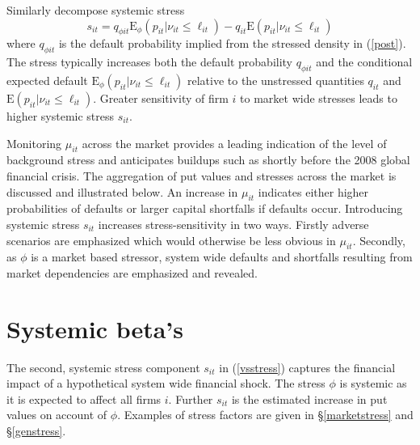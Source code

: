 \documentclass[authoryear]{elsarticle}
\newcommand{\E}{\mathrm{E}}
\newcommand{\eref}[1]{(\ref{#1})}
\newcommand{\sref}[1]{\S\ref{#1}}
\newcommand{\be}[1]{\begin{equation}\label{#1}}
\newcommand{\ee}{\end{equation}}
\begin{document}
Similarly decompose systemic stress
$$
s_{it} = q_{\phi it}\E_\phi(p_{it}|\nu_{it}\le \ell_{it})-q_{it}\E(p_{it}|\nu_{it} \le \ell_{it})
$$
where $q_{\phi it}$ is the default probability implied from the stressed density in \eref{post}. The stress typically increases both the default probability  $q_{\phi it}$ and the conditional expected default $\E_\phi(p_{it}|\nu_{it}\le \ell_{it})$ relative to the unstressed quantities $q_{it}$ and $\E(p_{it}|\nu_{it} \le \ell_{it})$. Greater sensitivity of firm $i$ to market wide stresses leads to higher systemic stress $s_{it}$.

Monitoring $\mu_{it}$ across the market provides a leading indication of the level of background stress and anticipates buildups such as shortly before the 2008 global financial crisis. The aggregation of put values and stresses across the market is discussed and illustrated below. An increase in $\mu_{it}$ indicates either higher probabilities of defaults or larger capital shortfalls if defaults occur. Introducing systemic stress $s_{it}$ increases stress-sensitivity in two ways. Firstly adverse scenarios are emphasized which would otherwise be less obvious in $\mu_{it}$. Secondly, as $\phi$ is a market based stressor, system wide defaults and shortfalls resulting from market dependencies are emphasized and revealed.

\section{Systemic beta's}

The second, systemic stress component $s_{it}$ in  \eref{vsstress}  captures the financial impact of a  hypothetical system wide financial shock.   The stress $\phi$ is systemic as it is expected to affect all firms $i$.  Further $s_{it}$ is the estimated   increase in put values on account of  $\phi$.   Examples of stress factors are given in \sref{marketstress} and \sref{genstress}.
\end{document}

